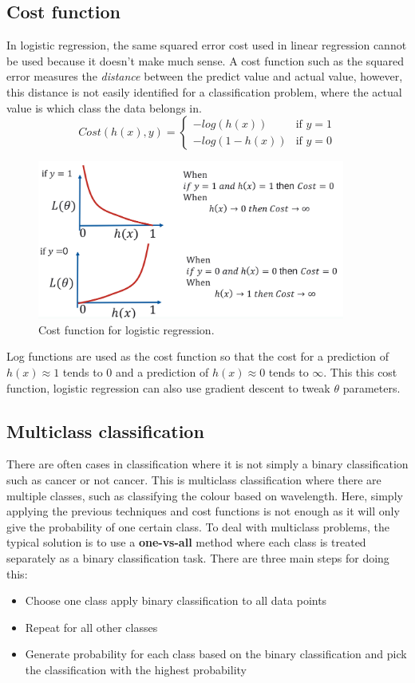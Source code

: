 \documentclass[CS5104-Notes.tex]{subfiles}
\begin{document}
\subsection{Cost function}
In logistic regression, the same squared error cost used in linear regression cannot be used because it doesn't make much sense. A cost function such as the squared error measures the \textit{distance} between the predict value and actual value, however, this distance is not easily identified for a classification problem, where the actual value is which class the data belongs in. 
\begin{equation}
Cost(h(x),y) = \begin{cases}
	-log(h(x)) & \text{if } y = 1 \\
	-log(1-h(x)) & \text{if } y = 0
	\end{cases}
\end{equation}
\begin{figure}[H]
\centering
\includegraphics[width=0.9\textwidth, keepaspectratio]{imgs/logistic-regression-cost.png}
\caption{Cost function for logistic regression.}
\end{figure}
\noindent
Log functions are used as the cost function so that the cost for a prediction of $h(x) \approx 1$ tends to 0 and a prediction of $h(x) \approx 0$ tends to $\infty$. This this cost function, logistic regression can also use gradient descent to tweak $\theta$ parameters.

\subsection{Multiclass classification}
There are often cases in classification where it is not simply a binary classification such as cancer or not cancer. This is multiclass classification where there are multiple classes, such as classifying the colour based on wavelength. Here, simply applying the previous techniques and cost functions is not enough as it will only give the probability of one certain class. To deal with multiclass problems, the typical solution is to use a \textbf{one-vs-all} method where each class is treated separately as a binary classification task. There are three main steps for doing this:
\begin{itemize}
\item Choose one class apply binary classification to all data points
\item Repeat for all other classes
\item Generate probability for each class based on the binary classification and pick the classification with the highest probability
\end{itemize}
\end{document}
